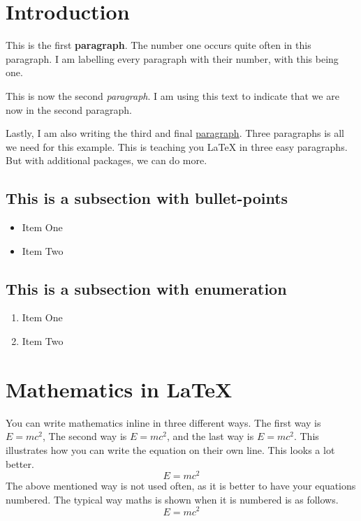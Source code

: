 \documentclass[a4paper, 10pt, english]{extarticle}
\begin{document}
\section{Introduction}

This is the first \textbf{paragraph}. The number one occurs quite often in this paragraph. I am labelling every paragraph with their number, with this being one.

This is now the second \textit{paragraph}.
I am using this text to indicate that we are now in the second paragraph.

Lastly, I am also writing the third and final \underline{paragraph}. Three paragraphs is all we need for this example. This is teaching you \LaTeX{} in three easy paragraphs. But with additional packages, we can  do more.

\subsection{This is a subsection with bullet-points}
\begin{itemize}
    \item Item One
    \item Item Two
\end{itemize}{}

\subsection{This is a subsection with enumeration}
\begin{enumerate}
    \item Item One
    \item Item Two
\end{enumerate}

\section{Mathematics in LaTeX}

You can write mathematics inline in three different ways. The first way is $E=mc^2$, The second way is \(E=mc^2\), and the last way is \begin{math}E=mc^2\end{math}.\newline
This illustrates how you can write the equation on their own line. This looks a lot better.
\[E=mc^2\]
The above mentioned way is not used often, as it is better to have your equations numbered. The typical way maths is shown when it is numbered is as follows. \begin{equation}
    E=mc^2
\end{equation}{}
\end{document}
